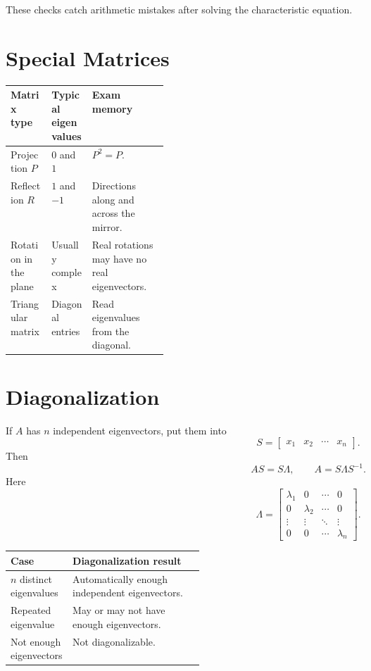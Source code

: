 \documentclass[10pt]{article}
\begin{document}
These checks catch arithmetic mistakes after solving the characteristic equation.

\section{Special Matrices}

\begin{center}
\small
\begin{tabularx}{\linewidth}{@{}L{0.26\linewidth}Y Y@{}}
\toprule
Matrix type & Typical eigenvalues & Exam memory \\
\midrule
Projection \(P\) & \(0\) and \(1\) & \(P^{2}=P\). \\
Reflection \(R\) & \(1\) and \(-1\) & Directions along and across the mirror. \\
Rotation in the plane & Usually complex & Real rotations may have no real eigenvectors. \\
Triangular matrix & Diagonal entries & Read eigenvalues from the diagonal. \\
\bottomrule
\end{tabularx}
\end{center}


\section{Diagonalization}

If \(A\) has \(n\) independent eigenvectors, put them into
\[
S=\begin{bmatrix}x_1&x_2&\cdots&x_n\end{bmatrix}.
\]
Then
\[
AS=S\Lambda,
\qquad
A=S\Lambda S^{-1}.
\]
Here
\[
\Lambda=
\begin{bmatrix}
\lambda_1&0&\cdots&0\\
0&\lambda_2&\cdots&0\\
\vdots&\vdots&\ddots&\vdots\\
0&0&\cdots&\lambda_n
\end{bmatrix}.
\]

\begin{center}
\small
\begin{tabularx}{\linewidth}{@{}L{0.32\linewidth}Y@{}}
\toprule
Case & Diagonalization result \\
\midrule
\(n\) distinct eigenvalues & Automatically enough independent eigenvectors. \\
Repeated eigenvalue & May or may not have enough eigenvectors. \\
Not enough eigenvectors & Not diagonalizable. \\
\bottomrule
\end{tabularx}
\end{center}
\end{document}
